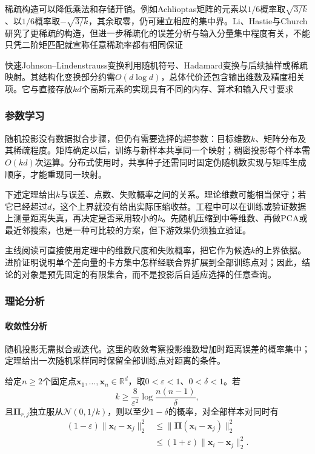 稀疏构造可以降低乘法和存储开销。例如Achlioptas矩阵的元素以$1/6$概率取$\sqrt{3/k}$、以$1/6$概率取$-\sqrt{3/k}$，其余取零，仍可建立相应的集中界。Li、Hastie与Church研究了更稀疏的构造，但进一步稀疏化的误差分析与输入分量集中程度有关，不能只凭二阶矩匹配就宣称任意稀疏率都有相同保证

快速Johnson--Lindenstrauss变换利用随机符号、Hadamard变换与后续抽样或稀疏映射。其结构化变换部分约需$O(d\log d)$，总体代价还包含输出维数及精度相关项。它与直接存放$kd$个高斯元素的实现具有不同的内存、算术和输入尺寸要求

\subsubsection{参数学习}
\label{sec:dim-rp-learning}

随机投影没有数据拟合步骤，但仍有需要选择的超参数：目标维数$k$、矩阵分布及其稀疏程度。矩阵确定以后，训练与新样本共享同一个映射；稠密投影每个样本需$O(kd)$次运算。分布式使用时，共享种子还需同时固定伪随机数实现与矩阵生成顺序，才能重现同一映射。

下述定理给出$k$与误差、点数、失败概率之间的关系。理论维数可能相当保守；若它已经超过$d$，这个上界就没有给出实际压缩收益。工程中可以在训练或验证数据上测量距离失真，再决定是否采用较小的$k$。先随机压缩到中等维数、再做PCA或最近邻搜索，也是一种可比较的方案，但下游效果仍须独立验证。

主线阅读可直接使用定理中的维数尺度和失败概率，把它作为候选$k$的上界依据。进阶证明说明单个差向量的卡方集中怎样经联合界扩展到全部训练点对；因此，结论的对象是预先固定的有限集合，而不是投影后自适应选择的任意查询。

\subsubsection{理论分析}
\label{sec:dim-rp-theory}

\paragraph{收敛性分析}

随机投影无需拟合或迭代。这里的收敛考察投影维数增加时距离误差的概率集中；定理给出一次随机采样同时保留全部训练点对距离的条件。

\begin{theorem}
  \label{thm:dim-jl}
  给定$n\geq2$个固定点$\bm{x}_1,\ldots,\bm{x}_n\in\mathbb{R}^{d}$，取$0<\varepsilon<1$、$0<\delta<1$。若
  \[
    k\geq\frac{8}{\varepsilon^2}
              \log\frac{n(n-1)}{\delta},
  \]
  且$\bm{\Pi}_{r,j}$独立服从$\mathcal{N}(0,1/k)$，则以至少$1-\delta$的概率，对全部样本对同时有
  \[
  \begin{aligned}
  (1-\varepsilon)\lVert\bm{x}_i-\bm{x}_j\rVert_2^2
  &\leq\lVert\bm{\Pi}(\bm{x}_i-\bm{x}_j)\rVert_2^2\\
  &\leq(1+\varepsilon)\lVert\bm{x}_i-\bm{x}_j\rVert_2^2.
  \end{aligned}
  \]
\end{theorem}


